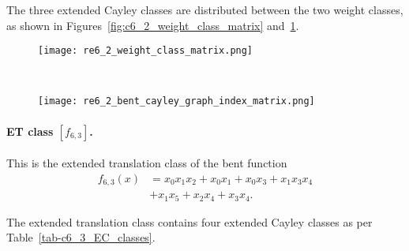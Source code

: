 \documentclass[12pt,a4paper]{article}
\begin{document}
The three extended Cayley classes are distributed between the two weight classes,
as shown in Figures~\ref{fig:c6_2_weight_class_matrix} and~\ref{fig:c6_2_bent_cayley_graph_index_matrix}.

\begin{figure}[!bhpt] %
\centering
\begin{minipage}{.48\textwidth}
  \centering
  \texttt{[image: re6\_2\_weight\_class\_matrix.png]}
  \label{fig:c6_2_weight_class_matrix}
\end{minipage}%
~~~~
\begin{minipage}{.48\textwidth}
  \centering
  \texttt{[image: re6\_2\_bent\_cayley\_graph\_index\_matrix.png]}
  \label{fig:c6_2_bent_cayley_graph_index_matrix}
\end{minipage}
\end{figure}

%
\paragraph*{ET class $[f_{6,3}]$.}
%
This is the extended translation class of the bent function
\begin{align*}
f_{6,3}(x) &= x_{0} x_{1} x_{2} + x_{0} x_{1} + x_{0} x_{3} + x_{1} x_{3} x_{4}
\\
           &+ x_{1} x_{5} + x_{2} x_{4} + x_{3} x_{4}.
\end{align*}

The extended translation class contains four extended Cayley classes as per Table~\ref{tab-c6_3_EC_classes}.
\end{document}
